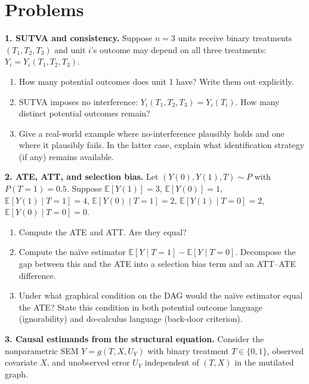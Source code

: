 \documentclass[
  a4paper,
]{book}
\providecommand{\tightlist}{%
  \setlength{\itemsep}{0pt}\setlength{\parskip}{0pt}}
\newcommand{\E}{\mathbb{E}}
\begin{document}
\section{Problems}\label{problems-3}

\textbf{1. SUTVA and consistency.} Suppose \(n = 3\) units receive
binary treatments \((T_1, T_2, T_3)\) and unit \(i\)'s outcome may
depend on all three treatments: \(Y_i = Y_i(T_1, T_2, T_3)\).

\begin{enumerate}
\def\labelenumi{(\alph{enumi})}
\tightlist
\item
  How many potential outcomes does unit 1 have? Write them out
  explicitly.
\item
  SUTVA imposes no interference: \(Y_i(T_1,T_2,T_3) = Y_i(T_i)\). How
  many distinct potential outcomes remain?
\item
  Give a real-world example where no-interference plausibly holds and
  one where it plausibly fails. In the latter case, explain what
  identification strategy (if any) remains available.
\end{enumerate}

\textbf{2. ATE, ATT, and selection bias.} Let \((Y(0), Y(1), T) \sim P\)
with \(P(T{=}1) = 0.5\). Suppose \(\E[Y(1)] = 3\), \(\E[Y(0)] = 1\),
\(\E[Y(1) \mid T{=}1] = 4\), \(\E[Y(0) \mid T{=}1] = 2\),
\(\E[Y(1) \mid T{=}0] = 2\), \(\E[Y(0) \mid T{=}0] = 0\).

\begin{enumerate}
\def\labelenumi{(\alph{enumi})}
\tightlist
\item
  Compute the ATE and ATT. Are they equal?
\item
  Compute the naïve estimator \(\E[Y \mid T{=}1] - \E[Y \mid T{=}0]\).
  Decompose the gap between this and the ATE into a selection bias term
  and an ATT--ATE difference.
\item
  Under what graphical condition on the DAG would the naïve estimator
  equal the ATE? State this condition in both potential outcome language
  (ignorability) and do-calculus language (back-door criterion).
\end{enumerate}

\textbf{3. Causal estimands from the structural equation.} Consider the
nonparametric SEM \(Y = g(T, X, U_Y)\) with binary treatment
\(T \in \{0,1\}\), observed covariate \(X\), and unobserved error
\(U_Y\) independent of \((T, X)\) in the mutilated graph.
\end{document}
